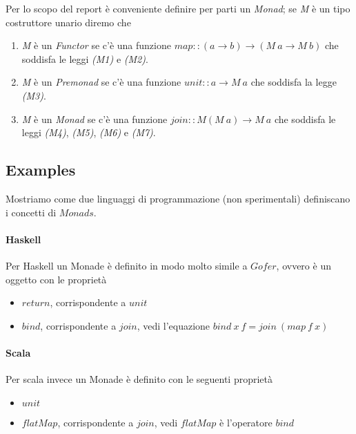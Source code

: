 Per lo scopo del report è conveniente definire per parti un \textit{Monad};
se \textit{M} è un tipo costruttore unario diremo che
\begin{enumerate}
  \item \textit{M} è un \textit{Functor} se c'è una funzione
    $map  :: (a \to b) \to (M \ a \to M \ b) $ che soddisfa le leggi
    \textit{(M1)} e \textit{(M2)}.
  \item \textit{M} è un \textit{Premonad} se c'è una funzione
    $unit :: a \to M\ a$ che soddisfa la legge \textit{(M3)}.
  \item \textit{M} è un \textit{Monad} se c'è una funzione
    $join :: M (M\ a) \to M\ a$ che soddisfa le leggi \textit{(M4)},
    \textit{(M5)}, \textit{(M6)} e \textit{(M7)}.

\end{enumerate}

\subsection*{Examples}

Mostriamo come due linguaggi di programmazione (non sperimentali) definiscano i concetti
di $Monads$.

\paragraph*{Haskell}
Per Haskell un Monade è definito in modo molto simile a $Gofer$, ovvero è un
oggetto con le proprietà
\begin{itemize}
  \item $return$, corrispondente a $unit$
  \item $bind$, corrispondente a $join$, vedi l'equazione $bind\ x\ f = join\ (map\ f\ x)$
\end{itemize}

\paragraph*{Scala}
Per scala invece un Monade è definito con le seguenti proprietà
\begin{itemize}
  \item $unit$
  \item $flatMap$, corrispondente a $join$, vedi $flatMap$ è l'operatore $bind$
\end{itemize}
\pagebreak